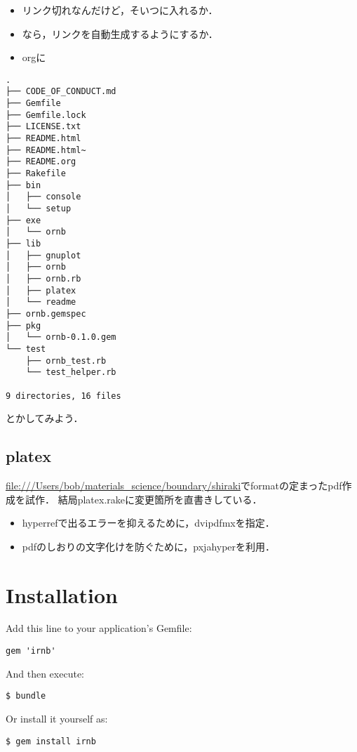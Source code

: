 \documentclass{jsarticle}
\begin{document}
\begin{itemize}
\item リンク切れなんだけど，そいつに入れるか．
\item なら，リンクを自動生成するようにするか．

\item orgに
\end{itemize}
\begin{verbatim}
.
├── CODE_OF_CONDUCT.md
├── Gemfile
├── Gemfile.lock
├── LICENSE.txt
├── README.html
├── README.html~
├── README.org
├── Rakefile
├── bin
│   ├── console
│   └── setup
├── exe
│   └── ornb
├── lib
│   ├── gnuplot
│   ├── ornb
│   ├── ornb.rb
│   ├── platex
│   └── readme
├── ornb.gemspec
├── pkg
│   └── ornb-0.1.0.gem
└── test
    ├── ornb_test.rb
    └── test_helper.rb

9 directories, 16 files
\end{verbatim}
とかしてみよう．

\subsection{platex}
\label{sec-2-3}
\url{file:///Users/bob/materials_science/boundary/shiraki}でformatの定まったpdf作成を試作．
結局platex.rakeに変更箇所を直書きしている．

\begin{itemize}
\item hyperrefで出るエラーを抑えるために，dvipdfmxを指定．
\item pdfのしおりの文字化けを防ぐために，pxjahyperを利用．
\end{itemize}

\section{Installation}
\label{sec-3}
Add this line to your application's Gemfile:

\begin{verbatim}
gem 'irnb'
\end{verbatim}

And then execute:

\begin{verbatim}
$ bundle
\end{verbatim}

Or install it yourself as:

\begin{verbatim}
$ gem install irnb
\end{verbatim}
\end{document}
